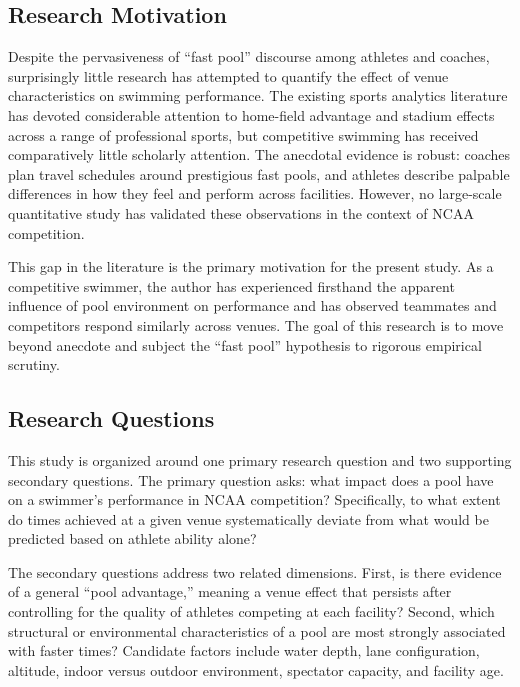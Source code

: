 \documentclass[12pt]{article}
\begin{document}
\subsection{Research Motivation}

Despite the pervasiveness of ``fast pool'' discourse among athletes and
coaches, surprisingly little research has attempted to quantify the effect of
venue characteristics on swimming performance. The existing sports analytics
literature has devoted considerable attention to home-field advantage and
stadium effects across a range of professional sports, but competitive swimming
has received comparatively little scholarly attention. The anecdotal evidence
is robust: coaches plan travel schedules around prestigious fast pools, and
athletes describe palpable differences in how they feel and perform across
facilities. However, no large-scale quantitative study has validated these
observations in the context of NCAA competition.

This gap in the literature is the primary motivation for the present study. As
a competitive swimmer, the author has experienced firsthand the apparent
influence of pool environment on performance and has observed teammates and
competitors respond similarly across venues. The goal of this research is to
move beyond anecdote and subject the ``fast pool'' hypothesis to rigorous
empirical scrutiny.

\subsection{Research Questions}

This study is organized around one primary research question and two supporting
secondary questions. The primary question asks: what impact does a pool have on
a swimmer's performance in NCAA competition? Specifically, to what extent do
times achieved at a given venue systematically deviate from what would be
predicted based on athlete ability alone?

The secondary questions address two related dimensions. First, is there
evidence of a general ``pool advantage,'' meaning a venue effect that persists
after controlling for the quality of athletes competing at each facility?
Second, which structural or environmental characteristics of a pool are most
strongly associated with faster times? Candidate factors include water depth,
lane configuration, altitude, indoor versus outdoor environment, spectator
capacity, and facility age.
\end{document}

